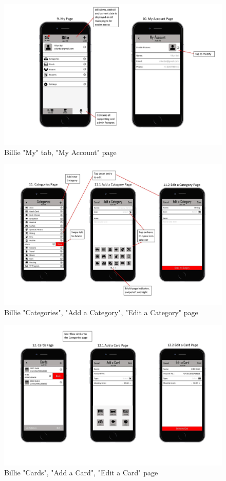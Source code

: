 \documentclass{sigchi}
\begin{document}
 \begin{figure}[h!]
\centering
  \includegraphics[width=1\columnwidth]{User-flow-page-007.jpg}
  \caption{Billie "My" tab, "My Account" page}
  \label{fig:figure46}
\end{figure} 
 \begin{figure}[h!]
\centering
  \includegraphics[width=1\columnwidth]{User-flow-page-008.jpg}
  \caption{Billie "Categories", "Add a Category", "Edit a Category" page}
  \label{fig:figure47}
\end{figure} 
 \begin{figure}[h!]
\centering
  \includegraphics[width=1\columnwidth]{User-flow-page-009.jpg}
  \caption{Billie "Cards", "Add a Card", "Edit a Card" page}
  \label{fig:figure48}
\end{figure} 
\end{document}
